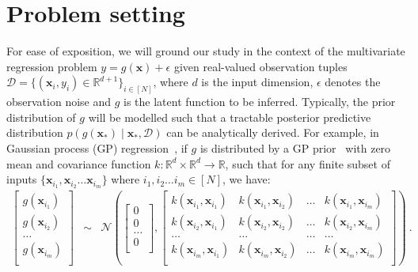 \label{c3:kernel}
\section{Problem setting}
For ease of exposition, we will ground our study in the context of the multivariate regression problem $y = g(\mathbf{x}) + \epsilon$ given real-valued observation tuples $\mathcal{D}=\{(\mathbf{x}_i, y_i) \in \mathbb{R}^{d+1}\}_{i \in [N]}$, where $d$ is the input dimension, $\epsilon$ denotes the observation noise and $g$ is the latent function to be inferred. Typically, the prior distribution of $g$ will be modelled such that a tractable posterior predictive distribution $p(g(\mathbf{x}_\ast) \mid \mathbf{x}_\ast, \mathcal{D})$ can be analytically derived. For example, in Gaussian process (GP) regression~\cite{Rasmussen06}, if $g$ is distributed by a GP prior~\cite{Rasmussen06} with zero mean and covariance function $k: \mathbb{R}^d \times \mathbb{R}^d \rightarrow \mathbb{R}$, such that for any finite subset of inputs $\{\mathbf{x}_{i_1}, \mathbf{x}_{i_2} \dots \mathbf{x}_{i_m}\}$ where $i_1, i_2 \dots i_m \in [N]$, we have:
\begin{eqnarray}
\left[
\begin{array}{c}
     g(\mathbf{x}_{i_1}) \\
     g(\mathbf{x}_{i_2}) \\
     \dots \\
     g(\mathbf{x}_{i_m}) \\
\end{array}
\right]
&\sim&
\mathcal{N}
\left(
\left[
\begin{array}{c}
     0 \\
     0 \\
     \dots \\
     0 \\
\end{array}
\right],
\left[
\begin{array}{cccc}
     k(\mathbf{x}_{i_1}, \mathbf{x}_{i_1}) & k(\mathbf{x}_{i_1}, \mathbf{x}_{i_2}) &
     \dots &
     k(\mathbf{x}_{i_1}, \mathbf{x}_{i_m}) \\
     
     k(\mathbf{x}_{i_2}, \mathbf{x}_{i_1}) & k(\mathbf{x}_{i_2}, \mathbf{x}_{i_2}) &
     \dots &
     k(\mathbf{x}_{i_2}, \mathbf{x}_{i_m}) \\
     
     \dots &
     \dots &
     \dots &
     \dots \\
     
     k(\mathbf{x}_{i_m}, \mathbf{x}_{i_1}) & k(\mathbf{x}_{i_m}, \mathbf{x}_{i_2}) &
     \dots &
     k(\mathbf{x}_{i_m}, \mathbf{x}_{i_m}) \\
\end{array}
\right]
\right) \nonumber \ .
\end{eqnarray}
